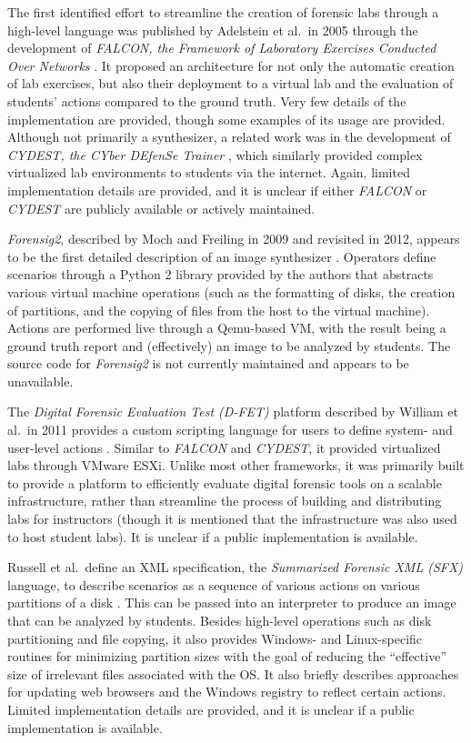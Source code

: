 \documentclass[letterpaper,12pt]{report}
\begin{document}
The first identified effort to streamline the creation of forensic labs
through a high-level language was published by Adelstein et al.~in 2005
through the development of \emph{FALCON, the Framework of Laboratory
Exercises Conducted Over Networks}
\cite{adelsteinAutomaticallyCreatingRealistic2005}. It proposed an
architecture for not only the automatic creation of lab exercises, but
also their deployment to a virtual lab and the evaluation of students'
actions compared to the ground truth. Very few details of the
implementation are provided, though some examples of its usage are
provided. Although not primarily a synthesizer, a related work was in
the development of \emph{CYDEST, the CYber DEfenSe Trainer}
\cite{bruecknerAutomatedComputerForensics2008}, which similarly
provided complex virtualized lab environments to students via the
internet. Again, limited implementation details are provided, and it is
unclear if either \emph{FALCON} or \emph{CYDEST} are publicly available
or actively maintained.

\emph{Forensig2}, described by Moch and Freiling in 2009 and revisited
in 2012, appears to be the first detailed description of an image
synthesizer
\cite{mochForensicImageGenerator2009,mochEvaluatingForensicImage2012}.
Operators define scenarios through a Python 2 library provided by the
authors that abstracts various virtual machine operations (such as the
formatting of disks, the creation of partitions, and the copying of
files from the host to the virtual machine). Actions are performed live
through a Qemu-based VM, with the result being a ground truth report and
(effectively) an image to be analyzed by students. The source code for
\emph{Forensig2} is not currently maintained and appears to be
unavailable.

The \emph{Digital Forensic Evaluation Test (D-FET)} platform described
by William et al.~in 2011 provides a custom scripting language for users
to define system- and user-level actions
\cite{williamCloudbasedDigitalForensics2011}. Similar to
\emph{FALCON} and \emph{CYDEST}, it provided virtualized labs through
VMware ESXi. Unlike most other frameworks, it was primarily built to
provide a platform to efficiently evaluate digital forensic tools on a
scalable infrastructure, rather than streamline the process of building
and distributing labs for instructors (though it is mentioned that the
infrastructure was also used to host student labs). It is unclear if a
public implementation is available.

Russell et al.~define an XML specification, the \emph{Summarized
Forensic XML (SFX)} language, to describe scenarios as a sequence of
various actions on various partitions of a disk
\cite{russellForensicImageDescription2012}. This can be passed into
an interpreter to produce an image that can be analyzed by students.
Besides high-level operations such as disk partitioning and file
copying, it also provides Windows- and Linux-specific routines for
minimizing partition sizes with the goal of reducing the ``effective''
size of irrelevant files associated with the OS. It also briefly
describes approaches for updating web browsers and the Windows registry
to reflect certain actions. Limited implementation details are provided,
and it is unclear if a public implementation is available.
\end{document}
